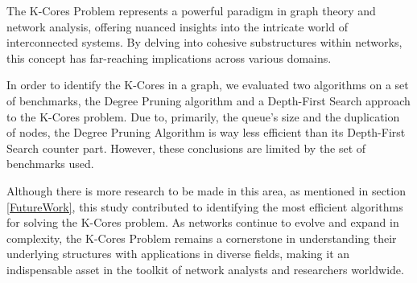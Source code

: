 \label{Conclusion}

The K-Cores Problem represents a powerful paradigm in graph theory and network analysis, offering nuanced insights into the intricate world of interconnected systems. By delving into cohesive substructures within networks, this concept has far-reaching implications across various domains.

In order to identify the K-Cores in a graph, we evaluated two algorithms on a set of benchmarks, the Degree Pruning algorithm and a Depth-First Search approach to the K-Cores problem. Due to, primarily, the queue's size and the duplication of nodes, the Degree Pruning Algorithm is way less efficient than its Depth-First Search counter part. However, these conclusions are limited by the set of benchmarks used.

Although there is more research to be made in this area, as mentioned in section \ref{FutureWork}, this study contributed to identifying the most efficient algorithms for solving the K-Cores problem. As networks continue to evolve and expand in complexity, the K-Cores Problem remains a cornerstone in understanding their underlying structures with applications in diverse fields, making it an indispensable asset in the toolkit of network analysts and researchers worldwide.
